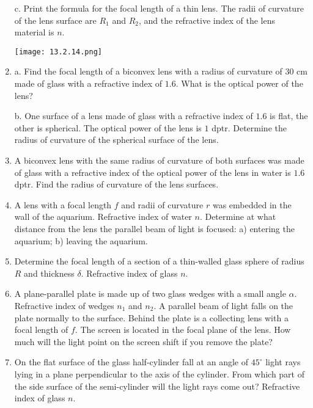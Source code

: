 \documentclass{article}
\begin{document}
\begin{enumerate}[label=13.2.\arabic*]
c. Print the formula for the focal length of a thin lens. The radii of curvature of the lens surface are $R_1$ and $R_2$, and the refractive index of the lens material is $n$.

\begin{center}
    \texttt{[image: 13.2.14.png]}
\end{center}


\item a. Find the focal length of a biconvex lens with a radius of curvature of $30$ cm made of glass with a refractive index of $1.6$. What is the optical power of the lens? 

b. One surface of a lens made of glass with a refractive index of $1.6$ is flat, the other is spherical. The optical power of the lens is $1$ dptr. Determine the radius of curvature of the spherical surface of the lens.

\item A biconvex lens with the same radius of curvature of both surfaces was made of glass with a refractive index of the optical power of the lens in water is $1.6$ dptr. Find the radius of curvature of the lens surfaces.

\item A lens with a focal length $f$ and radii of curvature $r$ was embedded in the wall of the aquarium. Refractive index of water $n$. Determine at what distance from the lens the parallel beam of light is focused: a) entering the aquarium; b) leaving the aquarium.

\item Determine the focal length of a section of a thin-walled glass sphere of radius $R$ and thickness $\delta$. Refractive index of glass $n$.

\item A plane-parallel plate is made up of two glass wedges with a small angle $\alpha$. Refractive index of wedges $n_1$ and $n_2$. A parallel beam of light falls on the plate normally to the surface. Behind the plate is a collecting lens with a focal length of $f$. The screen is located in the focal plane of the lens. How much will the light point on the screen shift if you remove the plate?

\item On the flat surface of the glass half-cylinder fall at an angle of $45^\circ$ light rays lying in a plane perpendicular to the axis of the cylinder. From which part of the side surface of the semi-cylinder will the light rays come out? Refractive index of glass $n$.


\end{enumerate}
\end{document}

